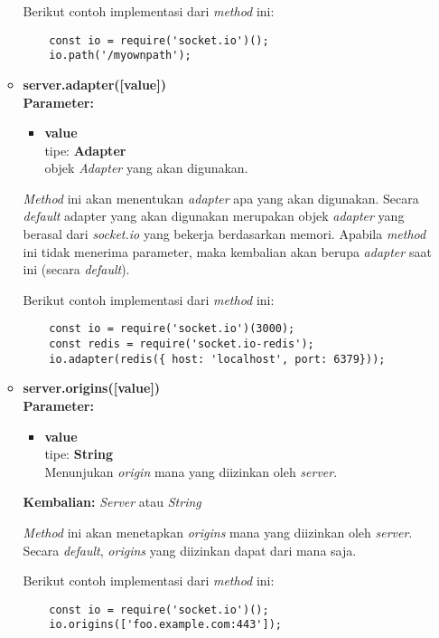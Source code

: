 \begin{enumerate}
\begin{itemize}
			Berikut contoh implementasi dari \textit{method} ini:
	\begin{lstlisting}
	const io = require('socket.io')();
	io.path('/myownpath');
	\end{lstlisting}
	
			\item \textbf{server.adapter([value])} \\
			\textbf{Parameter:}
			\begin{itemize}
				\item \textbf{value} \\tipe: \textbf{Adapter} \\ objek \textit{Adapter} yang akan digunakan.
			\end{itemize}
			\textit{Method} ini akan menentukan \textit{adapter} apa yang akan digunakan. Secara \textit{default} adapter yang akan digunakan merupakan objek \textit{adapter} yang berasal dari \textit{socket.io} yang bekerja berdasarkan memori. Apabila \textit{method} ini tidak menerima parameter, maka kembalian akan berupa \textit{adapter} saat ini (secara \textit{default}).
			
			Berikut contoh implementasi dari \textit{method} ini:
	\begin{lstlisting}
	const io = require('socket.io')(3000);
	const redis = require('socket.io-redis');
	io.adapter(redis({ host: 'localhost', port: 6379}));
	\end{lstlisting}
	
			\item \textbf{server.origins([value])} \\ 
			\textbf{Parameter:} 
			\begin{itemize}
				\item \textbf{value} \\tipe: \textbf{String} \\ Menunjukan \textit{origin} mana yang diizinkan oleh \textit{server}.
			\end{itemize}
			\textbf{Kembalian:} \textit{Server} atau \textit{String}
			
			\textit{Method} ini akan menetapkan \textit{origins} mana yang diizinkan oleh \textit{server}. Secara \textit{default}, \textit{origins} yang diizinkan dapat dari mana saja.
			
			Berikut contoh implementasi dari \textit{method} ini:
	\begin{lstlisting}
	const io = require('socket.io')();
	io.origins(['foo.example.com:443']);
	\end{lstlisting}
			

\end{itemize}
\end{enumerate}
